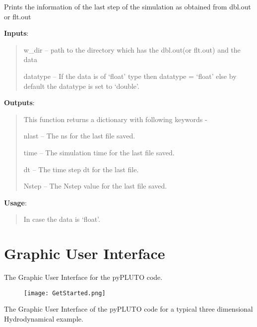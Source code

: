 \documentclass[letterpaper,10pt,english]{sphinxmanual}
\begin{document}
\begin{fulllineitems}
\label{index:pyPLUTO.nlast_info}
Prints the information of the last step of the simulation as obtained from dbl.out or flt.out

\textbf{Inputs}:
\begin{quote}

w\_dir -- path to the directory which has the dbl.out(or flt.out) and the data

datatype -- If the data is of `float' type then datatype = `float' else by default the datatype is set to `double'.
\end{quote}

\textbf{Outputs}:
\begin{quote}

This function returns a dictionary with following keywords -

nlast -- The ns for the last file saved.

time -- The simulation time for the last file saved.

dt -- The time step dt for the last file.

Nstep -- The Nstep value for the last file saved.
\end{quote}

\textbf{Usage}:
\begin{quote}

In case the data is `float'.



\end{quote}

\end{fulllineitems}



\chapter{Graphic User Interface}
\label{index:graphic-user-interface}
The Graphic User Interface for the pyPLUTO code.
\begin{figure}[htbp]
\centering

\texttt{[image: GetStarted.png]}
\end{figure}

The Graphic User Interface of the pyPLUTO code for a typical
three dimensional Hydrodynamical example.
\end{document}
